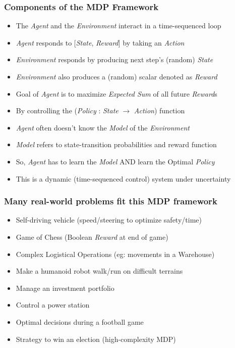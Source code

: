 \documentclass{beamer}
\begin{document}
\begin{frame}
\frametitle{Components of the MDP Framework}
\begin{itemize}
\item The {\em Agent} and the {\em Environment} interact in a time-sequenced loop
\item {\em Agent} responds to [{\em State}, {\em Reward}] by taking an {\em Action}
\item {\em Environment} responds by producing next step's (random) {\em State}
\item {\em Environment} also produces a (random) scalar denoted as {\em Reward}
\item Goal of {\em Agent} is to maximize {\em Expected Sum} of all future {\em Reward}s
\item By controlling the ({\em Policy} : {\em State} $\rightarrow$ {\em Action}) function
\item {\em Agent} often doesn't know the {\em Model} of the {\em Environment}
\item {\em Model} refers to state-transition probabilities and reward function
\item So, {\em Agent} has to learn the {\em Model} AND learn the Optimal {\em Policy}
\item This is a dynamic (time-sequenced control) system under uncertainty
\end{itemize}
\end{frame}

\begin{frame}
\frametitle{Many real-world problems fit this MDP framework}
\begin{itemize}
\item Self-driving vehicle (speed/steering to optimize safety/time)
\item Game of Chess (Boolean {\em Reward} at end of game)
\item Complex Logistical Operations (eg: movements in a Warehouse)
\item Make a humanoid robot walk/run on difficult terrains
\item Manage an investment portfolio
\item Control a power station
\item Optimal decisions during a football game
\item Strategy to win an election (high-complexity MDP)
\end{itemize}
\end{frame}
\end{document}
